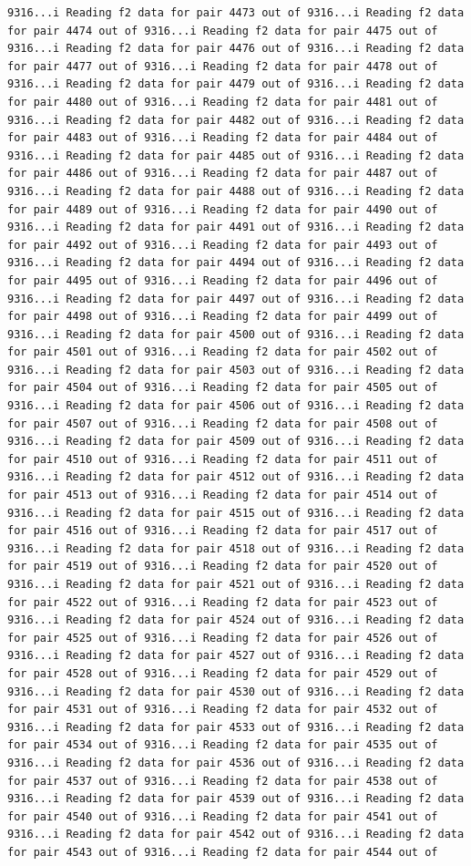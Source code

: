 \documentclass[
]{article}
\begin{document}
\begin{verbatim}
9316...i Reading f2 data for pair 4473 out of 9316...i Reading f2 data for pair 4474 out of 9316...i Reading f2 data for pair 4475 out of 9316...i Reading f2 data for pair 4476 out of 9316...i Reading f2 data for pair 4477 out of 9316...i Reading f2 data for pair 4478 out of 9316...i Reading f2 data for pair 4479 out of 9316...i Reading f2 data for pair 4480 out of 9316...i Reading f2 data for pair 4481 out of 9316...i Reading f2 data for pair 4482 out of 9316...i Reading f2 data for pair 4483 out of 9316...i Reading f2 data for pair 4484 out of 9316...i Reading f2 data for pair 4485 out of 9316...i Reading f2 data for pair 4486 out of 9316...i Reading f2 data for pair 4487 out of 9316...i Reading f2 data for pair 4488 out of 9316...i Reading f2 data for pair 4489 out of 9316...i Reading f2 data for pair 4490 out of 9316...i Reading f2 data for pair 4491 out of 9316...i Reading f2 data for pair 4492 out of 9316...i Reading f2 data for pair 4493 out of 9316...i Reading f2 data for pair 4494 out of 9316...i Reading f2 data for pair 4495 out of 9316...i Reading f2 data for pair 4496 out of 9316...i Reading f2 data for pair 4497 out of 9316...i Reading f2 data for pair 4498 out of 9316...i Reading f2 data for pair 4499 out of 9316...i Reading f2 data for pair 4500 out of 9316...i Reading f2 data for pair 4501 out of 9316...i Reading f2 data for pair 4502 out of 9316...i Reading f2 data for pair 4503 out of 9316...i Reading f2 data for pair 4504 out of 9316...i Reading f2 data for pair 4505 out of 9316...i Reading f2 data for pair 4506 out of 9316...i Reading f2 data for pair 4507 out of 9316...i Reading f2 data for pair 4508 out of 9316...i Reading f2 data for pair 4509 out of 9316...i Reading f2 data for pair 4510 out of 9316...i Reading f2 data for pair 4511 out of 9316...i Reading f2 data for pair 4512 out of 9316...i Reading f2 data for pair 4513 out of 9316...i Reading f2 data for pair 4514 out of 9316...i Reading f2 data for pair 4515 out of 9316...i Reading f2 data for pair 4516 out of 9316...i Reading f2 data for pair 4517 out of 9316...i Reading f2 data for pair 4518 out of 9316...i Reading f2 data for pair 4519 out of 9316...i Reading f2 data for pair 4520 out of 9316...i Reading f2 data for pair 4521 out of 9316...i Reading f2 data for pair 4522 out of 9316...i Reading f2 data for pair 4523 out of 9316...i Reading f2 data for pair 4524 out of 9316...i Reading f2 data for pair 4525 out of 9316...i Reading f2 data for pair 4526 out of 9316...i Reading f2 data for pair 4527 out of 9316...i Reading f2 data for pair 4528 out of 9316...i Reading f2 data for pair 4529 out of 9316...i Reading f2 data for pair 4530 out of 9316...i Reading f2 data for pair 4531 out of 9316...i Reading f2 data for pair 4532 out of 9316...i Reading f2 data for pair 4533 out of 9316...i Reading f2 data for pair 4534 out of 9316...i Reading f2 data for pair 4535 out of 9316...i Reading f2 data for pair 4536 out of 9316...i Reading f2 data for pair 4537 out of 9316...i Reading f2 data for pair 4538 out of 9316...i Reading f2 data for pair 4539 out of 9316...i Reading f2 data for pair 4540 out of 9316...i Reading f2 data for pair 4541 out of 9316...i Reading f2 data for pair 4542 out of 9316...i Reading f2 data for pair 4543 out of 9316...i Reading f2 data for pair 4544 out of 
\end{verbatim}
\end{document}
